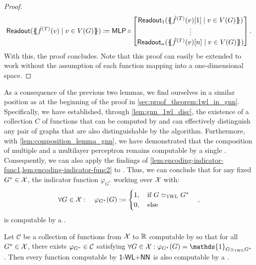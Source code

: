 \begin{proof}
    \begin{align*}
        \textsf{Readout}(\MSopen \hat{f}^{(T)}(v) \mid v \in V(G) \MSclose) \coloneqq \mlp \circ \begin{bmatrix}
            \textsf{Readout}_1(\MSopen \hat{f}^{(T)}(v)[1] \mid v \in V(G) \MSclose)\\
            \vdots\\
            \textsf{Readout}_n(\MSopen \hat{f}^{(T)}(v)[n] \mid v \in V(G) \MSclose)
        \end{bmatrix}.
    \end{align*}
    With this, the proof concludes. Note that this proof can easily be extended to work without the assumption of each function mapping into a one-dimensional space.
\end{proof}

As a consequence of the previous two lemmas, we find ourselves in a similar position as at the beginning of the proof in \cref{sec:proof_theorem:1wl_in_gnn}. Specifically, we have established, through \cref{lem:gnn_1wl_disc}, the existence of a collection $C$ of functions that can be computed by \gnns and can effectively distinguish any pair of graphs that are also distinguishable by the \wl algorithm. Furthermore, with \cref{lem:composition_lemma_gnn}, we have demonstrated that the composition of multiple \gnns and a multilayer perceptron remains computable by a single \gnn. Consequently, we can also apply the findings of \cref{lem:encoding-indicator-func1,lem:encoding-indicator-func2} to \gnns. Thus, we can conclude that for any fixed $G^* \in \mathcal{X}$, the indicator function $\varphi_{G^*}$ working over $\mathcal{X}$ with:
\begin{align*}
        \forall G \in \mathcal{X}: \quad \varphi_{G^*}(G) := 
        \begin{cases}
            1, \quad \text{if $G \simeq_{\text{1WL}} G^*$}\\
            0, \quad \text{else}
        \end{cases},
\end{align*}
is computable by a \gnn.

\begin{lemma}\label{lem:decompose_wl_as_gnn}
    Let $\mathcal{C}$ be a collection of functions from $\mathcal{X}$ to $\mathbb{R}$ computable by \gnns so that for all $G^* \in \mathcal{X}$, there exists 
    $\varphi_{G^*} \in \mathcal{C}$ satisfying $\forall G \in \cX: \varphi_{G^*}(G) = \mathds{1}_{G \wliso G^*}$. Then every function computable by $\textsf{1-WL+NN}$ is also computable by a \gnn.
\end{lemma}

